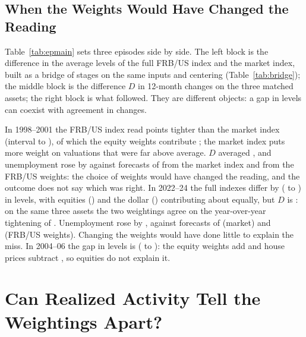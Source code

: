 \documentclass[11pt]{article}
\begin{document}
\subsection{When the Weights Would Have Changed the Reading}\label{sec:accounting}
Table~\ref{tab:epmain} sets three episodes side by side. The left block is the difference in the average levels of the full FRB/US index and the market index, built as a bridge of stages on the same inputs and centering (Table~\ref{tab:bridge}); the middle block is the difference $D$ in 12-month changes on the three matched assets; the right block is what followed. They are different objects: a gap in levels can coexist with agreement in changes.



In 1998--2001 the FRB/US index read  points tighter than the market index (interval  to ), of which the equity weights contribute ; the market index puts more weight on valuations that were far above average. $D$ averaged , and unemployment rose by  against forecasts of  from the market index and  from the FRB/US weights: the choice of weights would have changed the reading, and the outcome does not say which was right. In 2022--24 the full indexes differ by  ( to ) in levels, with equities () and the dollar () contributing about equally, but $D$ is : on the same three assets the two weightings agree on the year-over-year tightening of . Unemployment rose by , against forecasts of  (market) and  (FRB/US weights). Changing the weights would have done little to explain the miss. In 2004--06 the gap in levels is  ( to ): the equity weights add  and house prices subtract , so equities do not explain it.


\FloatBarrier

\section{Can Realized Activity Tell the Weightings Apart?}\label{sec:outlook}
\end{document}
